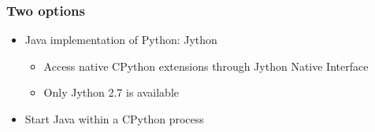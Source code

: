 \documentclass[%
]{beamer}
\newcommand{\cmark}{\ding{51}}%
\newcommand{\xmark}{\ding{55}}%
\newcommand{\rxmark}{\color{red}\xmark}
\newcommand{\urlScrSz}[1]{\scriptsize\url{#1}}
\begin{document}
\begin{frame}
    \frametitle{Two options}
    \begin{itemize}
          \item<1-> Java implementation of Python: Jython %
        \begin{itemize}
              \item<2->[\cmark] Access native CPython extensions through Jython Native Interface
              \item<3->[\rxmark] Only Jython 2.7 is available
        \end{itemize}
          \item<4-> Start Java within a CPython process
    \end{itemize}
\end{frame}
\end{document}

